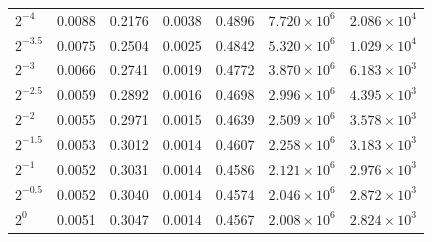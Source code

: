 \begin{table}
\begin{tabular}{lrrrrrr}
$2^{-4}$ & 0.0088 & 0.2176 & 0.0038 & 0.4896 & $7.720 \times 10^{6}$ & $2.086 \times 10^{4}$ \\
$2^{-3.5}$ & 0.0075 & 0.2504 & 0.0025 & 0.4842 & $5.320 \times 10^{6}$ & $1.029 \times 10^{4}$ \\
$2^{-3}$ & 0.0066 & 0.2741 & 0.0019 & 0.4772 & $3.870 \times 10^{6}$ & $6.183 \times 10^{3}$ \\
$2^{-2.5}$ & 0.0059 & 0.2892 & 0.0016 & 0.4698 & $2.996 \times 10^{6}$ & $4.395 \times 10^{3}$ \\
$2^{-2}$ & 0.0055 & 0.2971 & 0.0015 & 0.4639 & $2.509 \times 10^{6}$ & $3.578 \times 10^{3}$ \\
$2^{-1.5}$ & 0.0053 & 0.3012 & 0.0014 & 0.4607 & $2.258 \times 10^{6}$ & $3.183 \times 10^{3}$ \\
$2^{-1}$ & 0.0052 & 0.3031 & 0.0014 & 0.4586 & $2.121 \times 10^{6}$ & $2.976 \times 10^{3}$ \\
$2^{-0.5}$ & 0.0052 & 0.3040 & 0.0014 & 0.4574 & $2.046 \times 10^{6}$ & $2.872 \times 10^{3}$ \\
$2^{0}$ & 0.0051 & 0.3047 & 0.0014 & 0.4567 & $2.008 \times 10^{6}$ & $2.824 \times 10^{3}$ \\
\bottomrule
\end{tabular}
\end{table}
